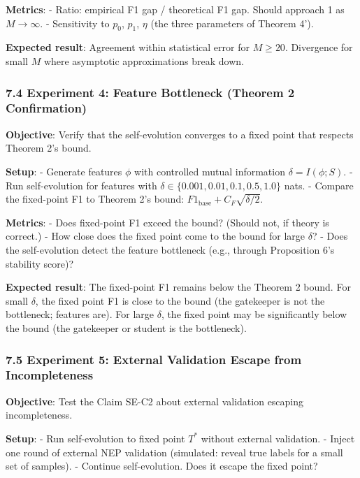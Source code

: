 \documentclass[
  12pt,
]{article}
\begin{document}
\textbf{Metrics}: - Ratio: empirical F1 gap / theoretical F1 gap. Should
approach 1 as \(M \to \infty\). - Sensitivity to \(p_0\), \(p_1\),
\(\eta\) (the three parameters of Theorem 4').

\textbf{Expected result}: Agreement within statistical error for
\(M \geq 20\). Divergence for small \(M\) where asymptotic
approximations break down.

\subsubsection{7.4 Experiment 4: Feature Bottleneck (Theorem 2
Confirmation)}\label{experiment-4-feature-bottleneck-theorem-2-confirmation}

\textbf{Objective}: Verify that the self-evolution converges to a fixed
point that respects Theorem 2's bound.

\textbf{Setup}: - Generate features \(\phi\) with controlled mutual
information \(\delta = I(\phi; S)\). - Run self-evolution for features
with \(\delta \in \{0.001, 0.01, 0.1, 0.5, 1.0\}\) nats. - Compare the
fixed-point F1 to Theorem 2's bound:
\(F1_{\text{base}} + C_F\sqrt{\delta/2}\).

\textbf{Metrics}: - Does fixed-point F1 exceed the bound? (Should not,
if theory is correct.) - How close does the fixed point come to the
bound for large \(\delta\)? - Does the self-evolution detect the feature
bottleneck (e.g., through Proposition 6's stability score)?

\textbf{Expected result}: The fixed-point F1 remains below the Theorem 2
bound. For small \(\delta\), the fixed point F1 is close to the bound
(the gatekeeper is not the bottleneck; features are). For large
\(\delta\), the fixed point may be significantly below the bound (the
gatekeeper or student is the bottleneck).

\subsubsection{7.5 Experiment 5: External Validation Escape from
Incompleteness}\label{experiment-5-external-validation-escape-from-incompleteness}

\textbf{Objective}: Test the Claim SE-C2 about external validation
escaping incompleteness.

\textbf{Setup}: - Run self-evolution to fixed point \(T^*\) without
external validation. - Inject one round of external NEP validation
(simulated: reveal true labels for a small set of samples). - Continue
self-evolution. Does it escape the fixed point?
\end{document}
